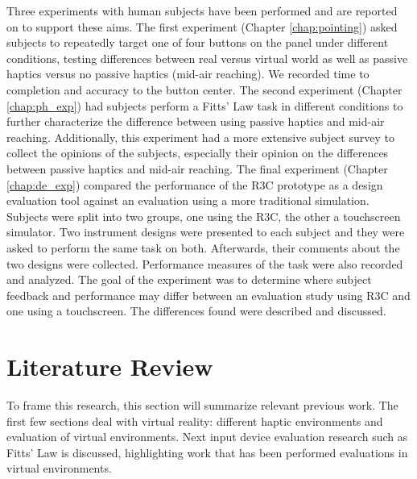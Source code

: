 Three experiments with human subjects have been performed and are reported on to support these aims.
The first experiment (Chapter \ref{chap:pointing}) asked subjects to repeatedly target one of four buttons on the panel under different conditions, testing differences between real versus virtual world as well as passive haptics versus no passive haptics (mid-air reaching).
We recorded time to completion and accuracy to the button center.
The second experiment (Chapter \ref{chap:ph_exp}) had subjects perform a Fitts' Law task in different conditions to further characterize the difference between using passive haptics and mid-air reaching.
Additionally, this experiment had a more extensive subject survey to collect the opinions of the subjects, especially their opinion on the differences between passive haptics and mid-air reaching.
The final experiment (Chapter \ref{chap:de_exp}) compared the performance of the R3C prototype as a design evaluation tool against an evaluation using a more traditional simulation.
Subjects were split into two groups, one using the R3C, the other a touchscreen simulator.
Two instrument designs were presented to each subject and they were asked to perform the same task on both.
Afterwards, their comments about the two designs were collected.
Performance measures of the task were also recorded and analyzed.
The goal of the experiment was to determine where subject feedback and performance may differ between an evaluation study using R3C and one using a touchscreen.
The differences found were described and discussed.


\section{Literature Review}
\label{literature-review}

To frame this research, this section will summarize relevant previous work.
The first few sections deal with virtual reality: different haptic environments and evaluation of virtual environments.
Next input device evaluation research such as Fitts' Law is discussed, highlighting work that has been performed evaluations in virtual environments.

